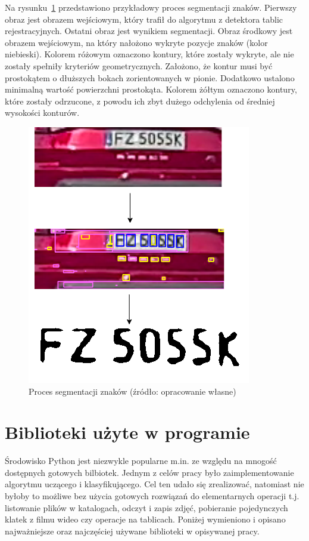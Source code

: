 \FloatBarrier
Na rysunku~\ref{fig:segmentation} przedstawiono przykładowy proces segmentacji znaków.
Pierwszy obraz jest obrazem wejściowym, który trafił do algorytmu z detektora tablic rejestracyjnych.
Ostatni obraz jest wynikiem segmentacji.
Obraz środkowy jest obrazem wejściowym, na który nałożono wykryte pozycje znaków (kolor niebieski).
Kolorem różowym oznaczono kontury, które zostały wykryte, ale nie zostały spełniły kryteriów geometrycznych.
Założono, że kontur musi być prostokątem o dłuższych bokach zorientowanych w pionie.
Dodatkowo ustalono minimalną wartość powierzchni prostokąta.
Kolorem żółtym oznaczono kontury, które zostały odrzucone, z powodu ich zbyt dużego odchylenia od średniej wysokości konturów.
\begin{figure}[!ht]
    \centering
    \includegraphics[scale=0.4]{Pictures/segmentation}
    \caption{Proces segmentacji znaków (źródło: opracowanie własne)}
    \label{fig:segmentation}
\end{figure}
\FloatBarrier


\section{Biblioteki użyte w programie}
Środowisko Python jest niezwykle popularne m.in. ze względu na mnogość dostępnych gotowych bilbiotek.
Jednym z celów pracy było zaimplementowanie algorytmu uczącego i klasyfikującego.
Cel ten udało się zrealizować, natomiast nie byłoby to możliwe bez użycia gotowych rozwiązań do elementarnych operacji t.j. listowanie plików w katalogach, odczyt i zapis zdjęć, pobieranie pojedynczych klatek z filmu wideo czy operacje na tablicach.
Poniżej wymieniono i opisano najważniejsze oraz najczęściej używane biblioteki w opisywanej pracy.


